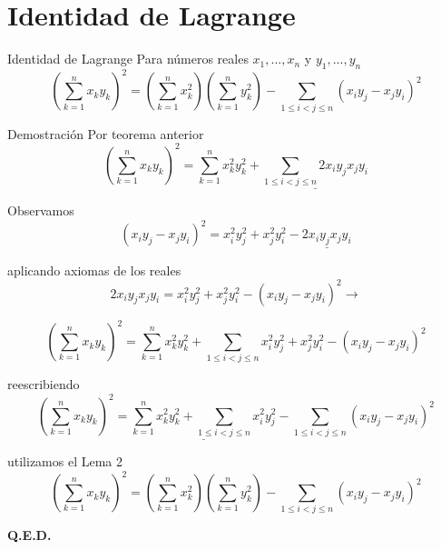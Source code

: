 \section{Identidad de Lagrange}

\begin{frame}{Identidad de Lagrange}
Para números reales $x_{1},...,x_{n}$ y $y_{1},...,y_{n}$
\begin{equation*}
    (\sum_{k=1}^{n}x_{k}y_{k})^{2} = (\sum_{k=1}^{n} x^{2}_{k})(\sum_{k=1}^{n}y^{2}_{k})-\sum_{1\leq i<j \leq n}(x_{i}y_{j}-x_{j}y_{i})^{2}
\end{equation*}
    
\end{frame}
\begin{frame}{Demostración}
Por teorema anterior 
\begin{equation}
    (\sum_{k=1}^{n}x_{k}y_{k})^{2} =  \sum_{k=1}^{n} x^{2}_{k}y^{2}_{k} +\underline{ \sum_{1 \leq i < j \leq n} 2 x_{i}y_{j}x_{j}y_{i}}
\end{equation}

Observamos
\begin{equation}
    (x_{i}y_{j} - x_{j}y_{i})^{2} = x^{2}_{i}y^{2}_{j}+x^{2}_{j}y^{2}_{i}-\underline{2x_{i}y_{j}x_{j}y_{i}}
\end{equation}
  
aplicando axiomas de los reales 
\begin{equation}
    2x_{i}y_{j}x_{j}y_{i} = x^{2}_{i}y^{2}_{j}+x^{2}_{j}y^{2}_{i} - (x_{i}y_{j} - x_{j}y_{i})^{2} \to 
\end{equation}

\begin{equation}
    (\sum_{k=1}^{n}x_{k}y_{k})^{2} = \sum_{k=1}^{n} x^{2}_{k}y^{2}_{k} + \sum_{1 \leq i < j \leq n}  x^{2}_{i}y^{2}_{j}+x^{2}_{j}y^{2}_{i} - (x_{i}y_{j} - x_{j}y_{i})^{2} 
\end{equation}

\end{frame}
\begin{frame}
    
reescribiendo 
\begin{equation}
    (\sum_{k=1}^{n}x_{k}y_{k})^{2} = \underline{ \sum_{k=1}^{n} x^{2}_{k}y^{2}_{k} +  \sum_{1 \leq i < j \leq n} x^{2}_{i}y^{2}_{j}} -  \sum_{1 \leq i < j \leq n} (x_{i}y_{j} - x_{j}y_{i})^{2} 
\end{equation}

utilizamos el Lema 2 
\begin{equation}
    (\sum_{k=1}^{n}x_{k}y_{k})^{2} = (\sum_{k=1}^{n} x^{2}_{k})(\sum_{k=1}^{n} y^{2}_{k}) -  \sum_{1 \leq i < j \leq n} (x_{i}y_{j} - x_{j}y_{i})^{2}
\end{equation}

\textbf{Q.E.D.}
\end{frame}